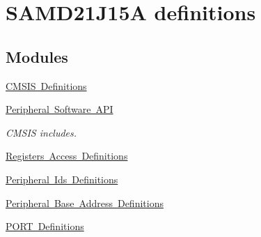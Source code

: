 \hypertarget{group___s_a_m_d21_j15_a__definitions}{}\section{S\+A\+M\+D21\+J15A definitions}
\label{group___s_a_m_d21_j15_a__definitions}
\subsection*{Modules}
\begin{DoxyCompactItemize}
\item 
\mbox{\hyperlink{group___s_a_m_d21_j15_a__cmsis}{C\+M\+S\+I\+S Definitions}}
\item 
\mbox{\hyperlink{group___s_a_m_d21_j15_a__api}{Peripheral Software A\+PI}}
\begin{DoxyCompactList}\small\item\em C\+M\+S\+IS includes. \end{DoxyCompactList}\item 
\mbox{\hyperlink{group___s_a_m_d21_j15_a__reg}{Registers Access Definitions}}
\item 
\mbox{\hyperlink{group___s_a_m_d21_j15_a__id}{Peripheral Ids Definitions}}
\item 
\mbox{\hyperlink{group___s_a_m_d21_j15_a__base}{Peripheral Base Address Definitions}}
\item 
\mbox{\hyperlink{group___s_a_m_d21_j15_a__port}{P\+O\+R\+T Definitions}}
\end{DoxyCompactItemize}
